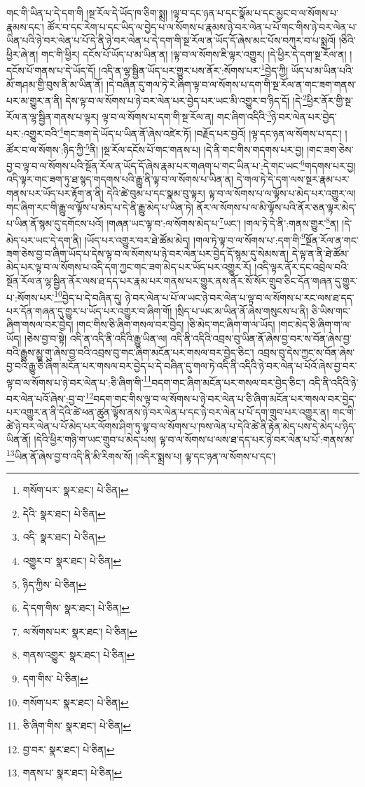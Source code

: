 གང་གི་ཡིན་པ་དེ་དག་གི །སྔ་རོལ་དེ་ཡོད་ཁ་ཅིག་སྨྲ། །ལྟ་བ་དང་ཉན་པ་དང་སྣོམ་པ་དང་མྱང་བ་ལ་སོགས་པ་རྣམས་དང་། ཚོར་བ་དང་རེག་པ་དང་ཡིད་ལ་བྱེད་པ་ལ་སོགས་པ་རྣམས་ཉེ་བར་ལེན་པ་པོ་གང་གིས་ཉེ་བར་ལེན་པ་ཡིན་པའི་ཉེ་བར་ལེན་པ་པོ་དེ་ནི་ཉེ་བར་ལེན་པ་དེ་དག་གི་སྔ་རོལ་ན་ཡོད་དོ་ཞེས་མང་པོས་བཀུར་བ་པ་སྨྲའོ། །ཅིའི་ཕྱིར་ཞེ་ན། གང་གི་ཕྱིར། དངོས་པོ་ཡོད་པ་མ་ཡིན་ན། །ལྟ་བ་ལ་སོགས་ཇི་ལྟར་འགྱུར། །དེ་ཕྱིར་དེ་དག་སྔ་རོལ་ན། །དངོས་པོ་གནས་པ་དེ་ཡོད་དོ། །འདི་ན་ལྷ་སྦྱིན་ཡོད་པར་གྱུར་པས་ནོར་:སོགས་པར་\footnote{གསོག་པར་  སྣར་ཐང་།  པེ་ཅིན། }བྱེད་ཀྱི། ཡོད་པ་མ་ཡིན་པའི་མོ་གཤམ་གྱི་བུས་ནི་མ་ཡིན་ནོ། །དེ་བཞིན་དུ་གལ་ཏེ་རེ་ཞིག་ལྟ་བ་ལ་སོགས་པ་དག་གི་སྔ་རོལ་ན་གང་ཟག་གནས་པར་མ་གྱུར་ན་ནི། དེས་ལྟ་བ་ལ་སོགས་པ་ཉེ་བར་ལེན་པར་བྱེད་པར་ཡང་མི་འགྱུར་བ་ཉིད་དོ། །དེ་\footnote{དེའི་  སྣར་ཐང་།  པེ་ཅིན། }ཕྱིར་ནོར་གྱི་སྔ་རོལ་ན་ལྷ་སྦྱིན་གནས་པ་ལྟར། ལྟ་བ་ལ་སོགས་པ་དག་གི་སྔ་རོལ་ན། གང་ཞིག་འདིའི་\footnote{འདི་  སྣར་ཐང་།  པེ་ཅིན། }ཉེ་བར་ལེན་པར་བྱེད་པར་:འགྱུར་བའི་\footnote{འགྱུར་བ་  སྣར་ཐང་།  པེ་ཅིན། }གང་ཟག་དེ་ཡོད་པ་ཡིན་ནོ་ཞེས་འཛེར་ཏོ། །བརྗོད་པར་བྱའོ། །ལྟ་དང་ཉན་ལ་སོགས་པ་དང་། །ཚོར་བ་ལ་སོགས་:ཉིད་ཀྱི་\footnote{ཉིད་ཀྱིས་  པེ་ཅིན། }ནི། །སྔ་རོལ་དངོས་པོ་གང་གནས་པ། །དེ་ནི་གང་གིས་གདགས་པར་བྱ། །གང་ཟག་ཅེས་བྱ་བ་ལྟ་བ་ལ་སོགས་པའི་སྔོན་རོལ་ན་ཡོད་དོ་ཞེས་རྣམ་པར་གཞག་པ་གང་ཡིན་པ་:དེ་གང་ཡང་\footnote{དེ་དག་གིས་  སྣར་ཐང་།  པེ་ཅིན། }གདགས་པར་བྱ། འདི་ལྟར་གང་ཟག་ཏུ་ཐ་སྙད་གདགས་པའི་རྒྱུ་ནི་ལྟ་བ་ལ་སོགས་པ་ཡིན་ན། དེ་གལ་ཏེ་དེ་དག་ལས་སྔར་རྣམ་པར་གནས་པར་ཡོད་པར་རྟོག་ན་ནི། དེའི་ཚེ་བུམ་པ་དང་སྣམ་བུ་ལྟར། ལྟ་བ་ལ་སོགས་པ་ལ་ལྟོས་པ་མེད་པར་འགྱུར་ལ། གང་ཞིག་རང་གི་རྒྱུ་ལ་ལྟོས་པ་མེད་པ་དེ་ནི་རྒྱུ་མེད་པ་ཡིན་ཏེ། ནོར་ལ་སོགས་པ་ལ་མི་ལྟོས་པའི་ནོར་ཅན་ལྟར་མེད་པ་ཡིན་ནོ་སྙམ་དུ་དགོངས་པའོ། །གཞན་ཡང་ལྟ་བ་:ལ་སོགས་མེད་པ་\footnote{ལ་སོགས་པར་  སྣར་ཐང་།  པེ་ཅིན། }ཡང་། །གལ་ཏེ་དེ་ནི་:གནས་གྱུར་\footnote{གནས་འགྱུར་  སྣར་ཐང་།  པེ་ཅིན། }ན། །དེ་མེད་པར་ཡང་དེ་དག་ནི། །ཡོད་པར་འགྱུར་བར་ཐེ་ཚོམ་མེད། །གལ་ཏེ་ལྟ་བ་ལ་སོགས་པ་:དག་གི་\footnote{དག་གིས་  པེ་ཅིན། }སྔོན་རོལ་ན་གང་ཟག་ཅེས་བྱ་བ་ཞིག་ཡོད་པ་དེས་ལྟ་བ་ལ་སོགས་པ་ཉེ་བར་ལེན་པར་བྱེད་དོ་སྙམ་དུ་སེམས་ན། དེ་ལྟ་ན་ནི་ཐེ་ཚོམ་མེད་པར་ལྟ་བ་ལ་སོགས་པ་འདི་དག་ཀྱང་གང་ཟག་མེད་པར་ཡོད་པར་འགྱུར་རོ། །འདི་ལྟར་ནོར་དང་འབྲེལ་བའི་སྔོན་རོལ་ན་ལྷ་སྦྱིན་ནོར་ལས་ཐ་དད་པར་རྣམ་པར་གནས་པར་གྱུར་ནས་ནོར་སོ་སོར་གྲུབ་ཅིང་དོན་གཞན་དུ་གྱུར་པ་:སོགས་པར་\footnote{གསོག་པར་  སྣར་ཐང་།  པེ་ཅིན། }བྱེད་པ་དེ་བཞིན་དུ། ཉེ་བར་ལེན་པ་པོ་ལ་ཡང་ཉེ་བར་ལེན་པ་ལྟ་བ་ལ་སོགས་པ་རང་ལས་ཐ་དད་པར་དོན་གཞན་དུ་གྱུར་པ་ཡོད་པར་འགྱུར་བ་ཞིག་གོ། །སྲིད་པ་ཡང་མ་ཡིན་ནོ་ཞེས་གསུངས་པ་ནི། ཅི་ཡིས་གང་ཞིག་གསལ་བར་བྱེད། །གང་གིས་ཅི་ཞིག་གསལ་བར་བྱེད། །ཅི་མེད་གང་ཞིག་ག་ལ་ཡོད། །གང་མེད་ཅི་ཞིག་ག་ལ་ཡོད། །ཅེས་བྱ་བ་སྟེ། འདི་ན་འདི་ནི་འདིའི་རྒྱུ་ཡིན་ལ། འདི་ནི་འདིའི་འབྲས་བུ་ཡིན་ནོ་ཞེས་བྱ་བར་ས་བོན་ཞེས་བྱ་བའི་རྒྱུས་མྱུ་གུ་ཞེས་བྱ་བའི་འབྲས་བུ་གང་ཞིག་མངོན་པར་གསལ་བར་བྱེད་ཅིང་། འབྲས་བུ་དེས་ཀྱང་ས་བོན་ཞེས་བྱ་བའི་རྒྱུ་ཅི་ཞིག་མངོན་པར་གསལ་བར་བྱེད་པ་དེ་བཞིན་དུ་གལ་ཏེ་འདི་ནི་འདིའི་ཉེ་བར་ལེན་པ་པོའོ་ཞེས་བྱ་བར་ལྟ་བ་ལ་སོགས་པ་ཉེ་བར་ལེན་པ་:ཅི་ཞིག་གི་\footnote{ཅི་ཞིག་གིས་  སྣར་ཐང་།  པེ་ཅིན། }བདག་གང་ཞིག་མངོན་པར་གསལ་བར་བྱེད་ཅིང་། འདི་ནི་འདིའི་ཉེ་བར་ལེན་པའོ་ཞེས་:བྱ་བ་\footnote{བྱ་བར་  སྣར་ཐང་།  པེ་ཅིན། }བདག་གང་གིས་ལྟ་བ་ལ་སོགས་པ་ཉེ་བར་ལེན་པ་ཅི་ཞིག་མངོན་པར་གསལ་བར་བྱེད་པར་འགྱུར་ན་ནི་དེའི་ཚེ་ཕན་ཚུན་ལྟོས་ནས་ཉེ་བར་ལེན་པ་དང་ཉེ་བར་ལེན་པ་པོ་དག་གྲུབ་པར་འགྱུར་ན། གང་གི་ཚེ་ཉེ་བར་ལེན་པ་པོ་མེད་པར་ལོགས་ཤིག་ཏུ་ལྟ་བ་ལ་སོགས་པ་ཁས་ལེན་པ་དེའི་ཚེ་ནི་རྟེན་མེད་པས་དེ་མེད་པ་ཉིད་ཡིན་ནོ། །དེའི་ཕྱིར་གཉི་ག་ཡང་གྲུབ་པ་མེད་པས། ལྟ་བ་ལ་སོགས་པ་ལས་ཐ་དད་པར་ཉེ་བར་ལེན་པ་པོ་:གནས་མ་\footnote{གནས་པ་  སྣར་ཐང་།  པེ་ཅིན། }ཡིན་ནོ་ཞེས་བྱ་བ་འདི་ནི་མི་རིགས་སོ། །འདིར་སྨྲས་པ། ལྟ་དང་ཉན་ལ་སོགས་པ་དང་། 